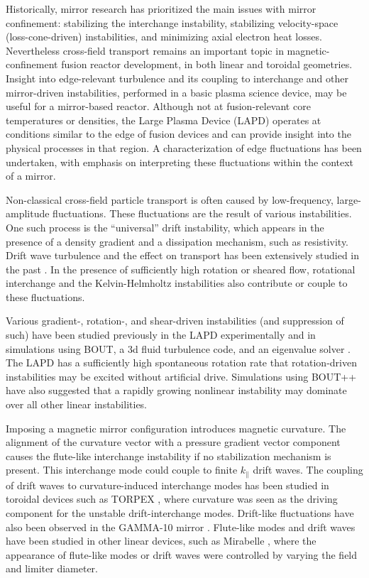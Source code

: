 Historically, mirror research has prioritized the main issues with mirror confinement: stabilizing the interchange instability, stabilizing velocity-space (loss-cone-driven) instabilities, and minimizing axial electron heat losses. Nevertheless cross-field transport remains an important topic in magnetic-confinement fusion reactor development, in both linear and toroidal geometries. Insight into edge-relevant turbulence and its coupling to interchange and other mirror-driven instabilities, performed in a basic plasma science device, may be useful for a mirror-based reactor. Although not at fusion-relevant core temperatures or densities, the Large Plasma Device (LAPD) operates at conditions similar to the edge of fusion devices and can provide insight into the physical processes in that region. 
A characterization of edge fluctuations has been undertaken, with emphasis on interpreting these fluctuations within the context of a mirror. 

Non-classical cross-field particle transport is often caused by low-frequency, large-amplitude fluctuations. These fluctuations are the result of various instabilities. One such process is the ``universal'' drift instability, which appears in the presence of a density gradient and a dissipation mechanism, such as resistivity. Drift wave turbulence and the effect on transport has been extensively studied in the past \cite{Horton_1999, Tynan_review_2009}. In the presence of sufficiently high rotation or sheared flow, rotational interchange and the Kelvin-Helmholtz instabilities also contribute or couple to these fluctuations. 

Various gradient-, rotation-, and shear-driven instabilities (and suppression of such) have been studied previously in the LAPD experimentally \cite{Schaffner_2012, Schaffner_turbulence_2013, Schaffner_2013} and in simulations using BOUT, a 3d fluid turbulence code, and an eigenvalue solver \cite{Popovich_2010}. The LAPD has a sufficiently high spontaneous rotation rate that rotation-driven instabilities may be excited without artificial drive. Simulations using BOUT++ \cite{Friedman_2013} have also suggested that a rapidly growing nonlinear instability may dominate over all other linear instabilities.

Imposing a magnetic mirror configuration introduces magnetic curvature. The alignment of the curvature vector with a pressure gradient vector component causes the flute-like interchange instability if no stabilization mechanism is present. This interchange mode could couple to finite $k_\parallel$ drift waves. The coupling of drift waves to curvature-induced interchange modes has been studied in toroidal devices such as TORPEX \cite{Poli_experimental_2006, Fasoli_electrostatic_2006}, where curvature was seen as the driving component for the unstable drift-interchange modes. Drift-like fluctuations have also been observed in the GAMMA-10 mirror \cite{Mase_1991, Yoshikawa_2010}. Flute-like modes and drift waves have been studied in other linear devices, such as Mirabelle \cite{Brochard_transition_2005}, where the appearance of flute-like modes or drift waves were controlled by varying the field and limiter diameter. 

